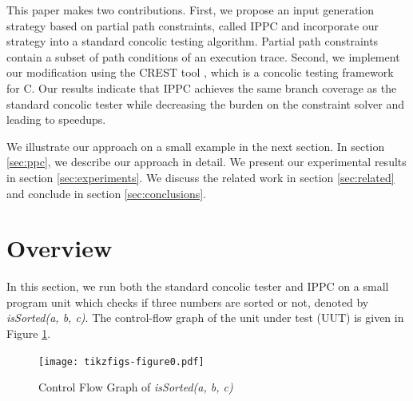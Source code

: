 \documentclass[EPiCempty]{easychair}
\begin{document}
This paper makes two contributions. First, we propose an input generation strategy based on partial path constraints, called IPPC and incorporate our strategy into a standard concolic testing algorithm. Partial path constraints contain a subset of path conditions of an execution trace. Second, we implement our modification using the CREST tool \cite{Burnim:2008:HSD:1642931.1642995}, which is a concolic testing framework for C. Our results indicate that IPPC achieves the same branch coverage as the standard concolic tester while decreasing the burden on the constraint solver and leading to speedups.

We illustrate our approach on a small example in the next section. In section \ref{sec:ppc}, we describe our approach in detail. We present our experimental results in section \ref{sec:experiments}. We discuss the related work in section \ref{sec:related} and conclude in section \ref{sec:conclusions}.

\section{Overview}
\label{sec:overview}

In this section, we run both the standard concolic tester and IPPC on a small program unit which checks if three numbers are sorted or not, denoted by \emph{isSorted(a, b, c)}. The control-flow graph of the unit under test (UUT) is given in Figure \ref{fig_cgf_example}.

\begin{figure}
\centering
\texttt{[image: tikzfigs-figure0.pdf]}
\caption{Control Flow Graph of \emph{isSorted(a, b, c)} \label{fig_cgf_example}}
\end{figure}
\end{document}
